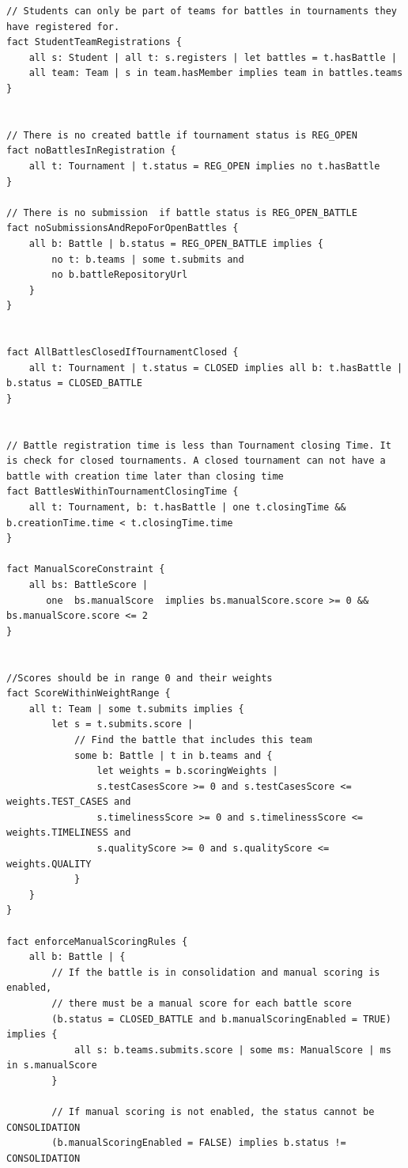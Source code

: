 \begin{lstlisting}[language=alloy]
// Students can only be part of teams for battles in tournaments they have registered for.
fact StudentTeamRegistrations {
    all s: Student | all t: s.registers | let battles = t.hasBattle |
    all team: Team | s in team.hasMember implies team in battles.teams
}


// There is no created battle if tournament status is REG_OPEN
fact noBattlesInRegistration {
    all t: Tournament | t.status = REG_OPEN implies no t.hasBattle
}

// There is no submission  if battle status is REG_OPEN_BATTLE
fact noSubmissionsAndRepoForOpenBattles {
    all b: Battle | b.status = REG_OPEN_BATTLE implies {
        no t: b.teams | some t.submits and
        no b.battleRepositoryUrl
    }
}


fact AllBattlesClosedIfTournamentClosed {
    all t: Tournament | t.status = CLOSED implies all b: t.hasBattle | b.status = CLOSED_BATTLE
}


// Battle registration time is less than Tournament closing Time. It is check for closed tournaments. A closed tournament can not have a battle with creation time later than closing time
fact BattlesWithinTournamentClosingTime {
    all t: Tournament, b: t.hasBattle | one t.closingTime && b.creationTime.time < t.closingTime.time
}

fact ManualScoreConstraint {
    all bs: BattleScore |
       one  bs.manualScore  implies bs.manualScore.score >= 0 && bs.manualScore.score <= 2
}


//Scores should be in range 0 and their weights
fact ScoreWithinWeightRange {
    all t: Team | some t.submits implies {
        let s = t.submits.score |
            // Find the battle that includes this team
            some b: Battle | t in b.teams and {
                let weights = b.scoringWeights |
                s.testCasesScore >= 0 and s.testCasesScore <= weights.TEST_CASES and
                s.timelinessScore >= 0 and s.timelinessScore <= weights.TIMELINESS and
                s.qualityScore >= 0 and s.qualityScore <= weights.QUALITY
            }
    }
}

fact enforceManualScoringRules {
    all b: Battle | {
        // If the battle is in consolidation and manual scoring is enabled,
        // there must be a manual score for each battle score
        (b.status = CLOSED_BATTLE and b.manualScoringEnabled = TRUE) implies {
            all s: b.teams.submits.score | some ms: ManualScore | ms in s.manualScore
        }
        
        // If manual scoring is not enabled, the status cannot be CONSOLIDATION
        (b.manualScoringEnabled = FALSE) implies b.status != CONSOLIDATION
        

\end{lstlisting}
